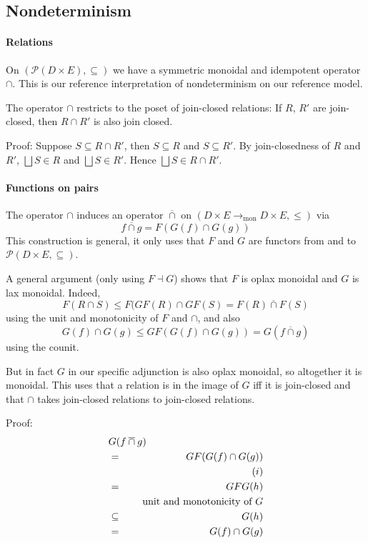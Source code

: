 \documentclass[9pt]{article}
\newcommand{\Pow}{\mathcal{P}}
\newcommand{\tomon}{\to_{\mathrm{mon}}}
\newcommand{\bigjoin}{\bigsqcup}
\newcommand{\caplift}{\mathbin{\overline{\cap}}}
\begin{document}
\subsection*{Nondeterminism}

\paragraph{Relations}

On $(\Pow(D \times E), \subseteq)$ we have a symmetric monoidal and
idempotent operator $\cap$. This is our reference interpretation
of nondeterminism on our reference model.

The operator $\cap$ restricts to the poset of join-closed relations:
If $R$, $R'$ are join-closed, then $R \cap R'$ is also join closed.

Proof: Suppose $S \subseteq R \cap R'$, then $S \subseteq R$ and
$S \subseteq R'$.  By join-closedness of $R$ and $R'$,
$\bigjoin S \in R$ and $\bigjoin S \in R'$.  Hence
$\bigjoin S \in R \cap R'$.

\paragraph{Functions on pairs}

The operator $\cap$ induces an operator $\caplift$ on
$(D\times E \tomon D \times E, \leq)$ via
\[
f \caplift g = F (G (f) \cap G(g))
\]  
This construction is general, it only uses that $F$ and $G$ are functors
from and to $\Pow(D\times E, \subseteq)$.

A general argument (only using $F \dashv G$) shows that $F$ is oplax
monoidal and $G$ is lax monoidal. Indeed,
\[
F (R \cap S) \leq F (GF (R) \cap GF (S) = F (R) \caplift F (S)
\]  
using the unit and monotonicity of $F$ and $\cap$, and also
\[
G (f) \cap G (g) \leq  GF (G(f) \cap G(g)) =  G (f \caplift g)
\]  
using the counit.

But in fact $G$ in our specific adjunction is also oplax monoidal, so
altogether it is monoidal.  This uses that a relation is in the image
of $G$ iff it is join-closed and that $\cap$ takes join-closed
relations to join-closed relations.

Proof:
\begin{eqnarray*}
\lefteqn{ G (f \caplift g) } \\
  & = & GF (G(f) \cap G (g)) \\
  & & \quad (i) \\
  & = & GFG (h) \\
  & & \quad \textrm{~unit and monotonicity of $G$} \\
& \subseteq & G (h) \\
& = & G (f) \cap  G (g) 
\end{eqnarray*}  
\end{document}
